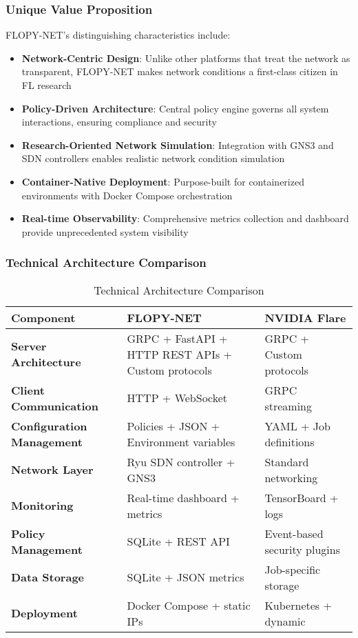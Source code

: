 \subsubsection{Unique Value Proposition}

FLOPY-NET's distinguishing characteristics include:

\begin{itemize}
    \item \textbf{Network-Centric Design}: Unlike other platforms that treat the network as transparent, FLOPY-NET makes network conditions a first-class citizen in FL research
    \item \textbf{Policy-Driven Architecture}: Central policy engine governs all system interactions, ensuring compliance and security
    \item \textbf{Research-Oriented Network Simulation}: Integration with GNS3 and SDN controllers enables realistic network condition simulation
    \item \textbf{Container-Native Deployment}: Purpose-built for containerized environments with Docker Compose orchestration
    \item \textbf{Real-time Observability}: Comprehensive metrics collection and dashboard provide unprecedented system visibility
\end{itemize}

\subsubsection{Technical Architecture Comparison}

\begin{table}[H]
\centering
\caption{Technical Architecture Comparison}
\label{tab:architecture-comparison}
\begin{tabularx}{\textwidth}{@{}lXX@{}}
\toprule
\textbf{Component} & \textbf{FLOPY-NET} & \textbf{NVIDIA Flare} \\
\midrule
\textbf{Server Architecture} & GRPC + FastAPI + HTTP REST APIs + Custom protocols & GRPC + Custom protocols \\
\textbf{Client Communication} & HTTP + WebSocket & GRPC streaming \\
\textbf{Configuration Management} & Policies + JSON + Environment variables & YAML + Job definitions \\
\textbf{Network Layer} & Ryu SDN controller + GNS3 & Standard networking \\
\textbf{Monitoring} & Real-time dashboard + metrics & TensorBoard + logs \\
\textbf{Policy Management} & SQLite + REST API & Event-based security plugins \\
\textbf{Data Storage} & SQLite + JSON metrics & Job-specific storage \\
\textbf{Deployment} & Docker Compose + static IPs & Kubernetes + dynamic \\
\bottomrule
\end{tabularx}
\end{table}

